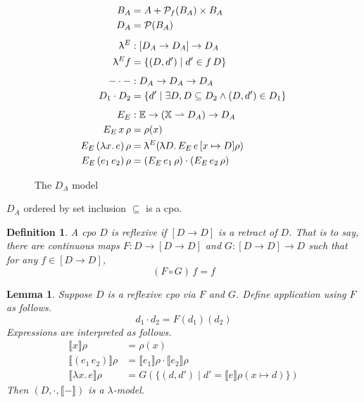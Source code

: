 \documentclass{tufte-handout}
\newcommand{\SEM}[1]{\llbracket #1 \rrbracket}
\newcommand{\LAM}[1]{\lambda #1.\,}
\newcommand{\APP}[0]{\,}
\newcommand{\pto}[0]{\rightharpoonup}
\newcommand{\VAR}[0]{\mathbb{X}}
\newcommand{\ext}[3]{#3(#1{\mapsto}#2)}
\newtheorem{lemma}[theorem]{Lemma}
\newtheorem{definition}{Definition}%
\begin{document}
\begin{figure}[tbp]
\begin{align*}
  B_A &= A + \mathcal{P}_f(B_A) \times B_A \\
  D_A &= \mathcal{P}(B_A) \\[1ex]
   \uplambda^E &: [D_A \to D_A] \to D_A \\
   \uplambda^E f &= \{ (D,d') \mid d' \in f\, D \} \\[1ex]
   - \cdot - &: D_A \to D_A \to D_A \\
   D_1 \cdot D_2 &= \{ d' \mid \exists D, D \subseteq D_2 \land (D,d') \in D_1 \} \\[1ex]
\EE &: \mathbb{E} \to (\VAR\pto D_A) \to D_A\\
\ESEM{ x }\rho &= \rho(x) \\
\ESEM{ (\LAM{x} e) }\rho &= \uplambda^E (\uplambda D.\, \ESEM{e}[x\mapsto D]\rho)\\
\ESEM{ (e_1\,e_2) }\rho &= (\ESEM{ e_1 }\rho) \cdot (\ESEM{ e_2 }\rho) 
\end{align*}
\caption{The $D_A$ model}
\label{fig:d-a}
\end{figure}


$D_A$ ordered by set inclusion $\subseteq$ is a cpo.


\begin{definition}
  A cpo $D$ is \emph{reflexive} if $[D \to D]$ is a retract of $D$.
  That is to say, there are continuous maps $F:D \to [D \to D]$ and
  $G: [D \to D] \to D $ such that for any $f \in [D \to D]$,
  \[
    (F \circ G)\, f = f
  \]
\end{definition}

\begin{lemma}
  Suppose $D$ is a reflexive cpo via $F$ and $G$.
  Define application using $F$ as follows.
  \[
    d_1 \cdot d_2 = F(d_1)(d_2)
  \]
  Expressions are interpreted as follows.
  \begin{align*}
      \SEM{x}\rho &= \rho(x) \\
      \SEM{(e_1\APP e_2)}\rho &= \SEM{e_1}\rho \cdot \SEM{e_2}\rho \\
      \SEM{\LAM{x} e}\rho &= G(\{ (d,d') \mid 
           d' = \SEM{e}\ext{x}{d}{\rho} \})
  \end{align*}
  Then $(D, \cdot,\SEM{-})$ is a $\lambda$-model. 
\end{lemma}
\end{document}
